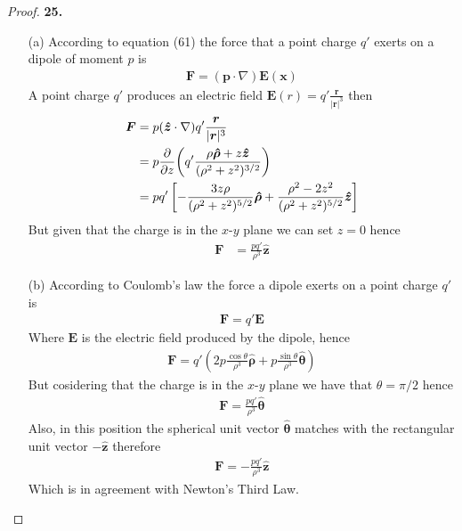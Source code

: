 \documentclass[11pt]{article}
\newcommand{\hatz}{\bm{\hat{z}}}
\newcommand{\hatrho}{\bm{\hat{\rho}}}
\newcommand{\hattheta}{\bm{\hat{\theta}}}
\theoremstyle{definition}
\begin{document}
\begin{proof}{\textbf{25.}}
    \begin{itemize}
        \item [(a)] According to equation (61) the force that a point charge
        $q'$ exerts on a dipole of moment $p$ is
        \begin{align*}
            \bm{F} = (\bm{p}\cdot\nabla) \bm{E}(\bm{x})
        \end{align*}
        A point charge $q'$ produces an electric field
        $\bm{E}(r) = q'\frac{\bm{r}}{|\bm{r}|^3}$ then
        \begin{align*}
            \bm{F} &= p(\hatz\cdot\nabla) q'\frac{\bm{r}}{|\bm{r}|^3}\\
            &= p\pdv{z}(q'\frac{\rho\hatrho + z\hatz}{(\rho^2 + z^2)^{3/2}})\\
            &= pq'\left[-\frac{3z\rho}{(\rho^2 + z^2)^{5/2}}\hatrho
            + \frac{\rho^2 - 2z^2}{(\rho^2 + z^2)^{5/2}}\hatz\right]
        \end{align*}
        But given that the charge is in the $x$-$y$ plane we can set
        $z=0$ hence
        \begin{align*}
            \bm{F} &= \frac{pq'}{\rho^3}\hatz       
        \end{align*}

        \item [(b)] According to Coulomb's law the force a dipole exerts on
        a point charge $q'$ is 
        \begin{align*}
            \bm{F} = q'\bm{E}
        \end{align*}
        Where $\bm{E}$ is the electric field produced by the dipole, hence
        \begin{align*}
            \bm{F} = q'\left(
                2p\frac{\cos\theta}{\rho^3}\hatrho
                + p\frac{\sin\theta}{\rho^3}\hattheta
            \right)
        \end{align*}
        But cosidering that the charge is in the $x$-$y$ plane we have that
        $\theta = \pi/2$ hence
        \begin{align*}
            \bm{F} = \frac{pq'}{\rho^3}\hattheta
        \end{align*}
        Also, in this position the spherical unit vector $\hattheta$
        matches with the rectangular unit vector $-\hatz$
        therefore 
        \begin{align*}
            \bm{F} = -\frac{pq'}{\rho^3}\hatz
        \end{align*}
        Which is in agreement with Newton's Third Law.
    \end{itemize}
\end{proof}
\end{document}

